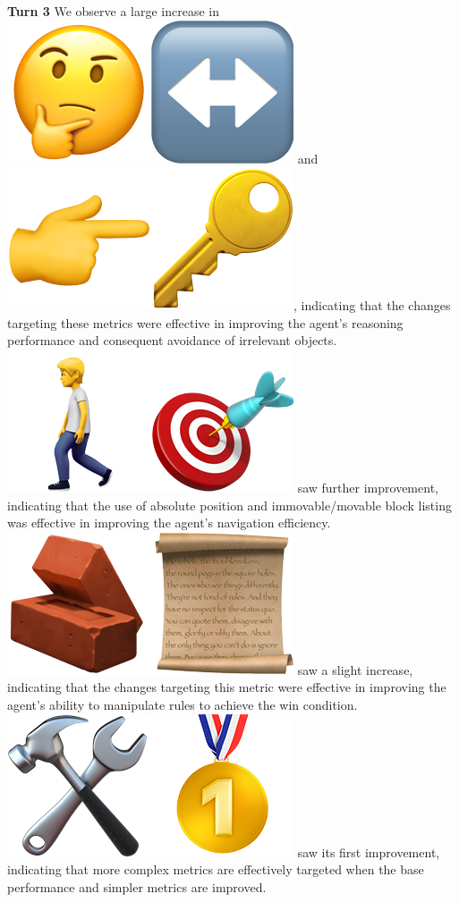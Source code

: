 \textbf{Turn 3}
We observe a large increase in \includegraphics[scale=0.07]{figs/emojis/emoji_4.png} and \includegraphics[scale=0.07]{figs/emojis/emoji_6.png}, indicating that the changes targeting these metrics were effective in improving the agent's reasoning performance and consequent avoidance of irrelevant objects. \includegraphics[scale=0.07]{figs/emojis/emoji_3.png} saw further improvement, indicating that the use of absolute position and immovable/movable block listing was effective in improving the agent's navigation efficiency. \includegraphics[scale=0.07]{figs/emojis/emoji_7.png} saw a slight increase, indicating that the changes targeting this metric were effective in improving the agent's ability to manipulate rules to achieve the win condition. \includegraphics[scale=0.07]{figs/emojis/emoji_5.png} saw its first improvement, indicating that more complex metrics are effectively targeted when the base performance and simpler metrics are improved.

